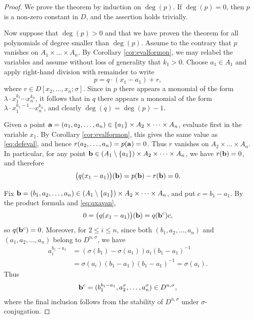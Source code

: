 \documentclass[11pt,reqno]{amsart}
\theoremstyle{definition}
\begin{document}
\begin{proof}%
We prove the theorem by induction on $\deg(p)$. If $\deg(p) = 0$, then $p$ is a non-zero constant in $D$, and the assertion holds trivially. 

Now suppose that $\deg(p) > 0$ and that we have proven the theorem for all polynomials of degree smaller than $\deg(p)$. Assume to the contrary that $p$ vanishes on $A_1 \times \dots \times A_n$. By Corollary \ref{cor:evalformon}, we may relabel the variables and assume without loss of generality that $k_1 > 0$. Choose $a_1 \in A_1$ and apply right-hand division with remainder to write
$$
p=q\cdot (x_1-a_1)+r,
$$
where $r \in D[x_2,\ldots,x_n;\sigma]$. Since in $p$ there appears a monomial of the form $\lambda \cdot x_1^{k_1}\cdots x_n^{k_n}$, it follows that in $q$ there appears a monomial of the form $\lambda \cdot x_1^{k_1-1}\cdots x_n^{k_n}$, and clearly $\deg(q) = \deg(p)-1$.  

Given a point ${\bf a}=(a_1,a_2,\ldots,a_n) \in \{a_1\} \times A_2 \times \dots \times A_n$, evaluate first in the variable $x_1$. By Corollary \ref{cor:evalformon}, this gives the same value as \eqref{eq:defeval}, and hence $r(a_2,\ldots,a_n)=p({\bf a})=0$. Thus $r$ vanishes on $A_2 \times \dots \times A_n$. In particular, for any point ${\bf b} \in (A_1 \setminus\{a_1\}) \times A_2 \times \dots \times A_n$, we have $r({\bf b}) = 0$, and therefore
\begin{equation}\label{eq:qxavan}
\big( q(x_1-a_1) \big) ({\bf b}) = p({\bf b}) - r({\bf b}) = 0.
\end{equation}

Fix ${\bf b}=(b_1,a_2,\dots,a_n) \in (A_1 \setminus\{a_1\}) \times A_2 \times \dots \times A_n$, and put $c=b_1-a_1$. By the product formula and \eqref{eq:qxavan},
$$
0=\big(q(x_1-a_1)\big)({\bf b})=q({\bf b}^{c})c,
$$
so $q({\bf b}^{c})=0$. Moreover, for $2 \leq i \leq n$, since both $(b_1,a_2,\ldots,a_n)$ and $(a_1,a_2,\ldots,a_n)$ belong to $D^{n,\sigma}$, we have
\begin{align}\label{eq:comaibmoina}
a_i^{b_1-a_1}
&= (\sigma(b_1)-\sigma(a_1))a_i(b_1-a_1)^{-1} \nonumber\\
&=\sigma(a_i)(b_1-a_1)(b_1-a_1)^{-1}=\sigma(a_i).
\end{align}
Thus
$$
{\bf b}^{c}=(b_1^{b_1-a_1},a_2^\sigma,\ldots,a_n^\sigma)\in D^{n,\sigma},
$$
where the final inclusion follows from the stability of $D^{n,\sigma}$ under $\sigma$-conjugation.


\end{proof}
\end{document}
